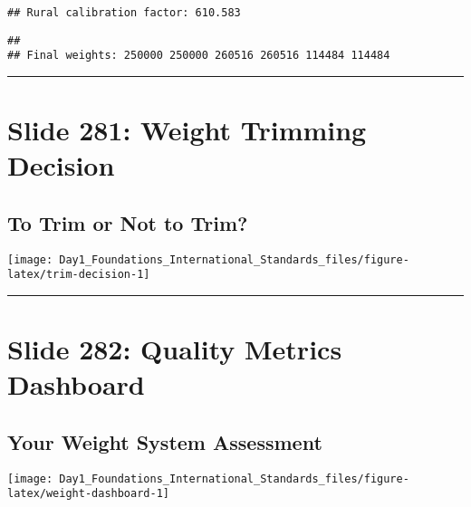 \documentclass[
]{article}
\newenvironment{Shaded}{\begin{snugshade}}{\end{snugshade}}
\newcommand{\FunctionTok}[1]{\textcolor[rgb]{0.13,0.29,0.53}{\textbf{#1}}}
\newcommand{\NormalTok}[1]{#1}
\newcommand{\SpecialCharTok}[1]{\textcolor[rgb]{0.81,0.36,0.00}{\textbf{#1}}}
\newcommand{\StringTok}[1]{\textcolor[rgb]{0.31,0.60,0.02}{#1}}
\begin{document}
\begin{verbatim}
## Rural calibration factor: 610.583
\end{verbatim}

\begin{Shaded}
\end{Shaded}

\begin{verbatim}
## 
## Final weights: 250000 250000 260516 260516 114484 114484
\end{verbatim}

\begin{center}\rule{0.5\linewidth}{0.5pt}\end{center}

\section{Slide 281: Weight Trimming
Decision}\label{slide-281-weight-trimming-decision}

\subsection{To Trim or Not to Trim?}\label{to-trim-or-not-to-trim}

\texttt{[image: Day1\_Foundations\_International\_Standards\_files/figure-latex/trim-decision-1]}

\begin{center}\rule{0.5\linewidth}{0.5pt}\end{center}

\section{Slide 282: Quality Metrics
Dashboard}\label{slide-282-quality-metrics-dashboard}

\subsection{Your Weight System
Assessment}\label{your-weight-system-assessment}

\texttt{[image: Day1\_Foundations\_International\_Standards\_files/figure-latex/weight-dashboard-1]}
\end{document}
